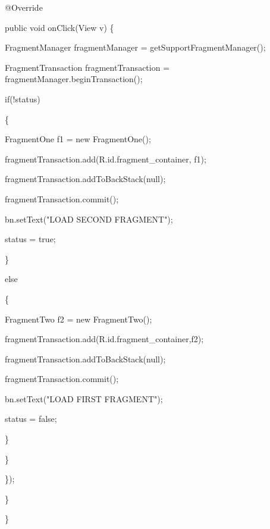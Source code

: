 \documentclass{article}
\begin{document}
@Override

public void onClick(View v) \{

FragmentManager fragmentManager = getSupportFragmentManager();

FragmentTransaction fragmentTransaction = fragmentManager.beginTransaction();

if(!status)

\{

FragmentOne f1 = new FragmentOne();

fragmentTransaction.add(R.id.fragment\_container, f1);

fragmentTransaction.addToBackStack(null);

fragmentTransaction.commit();

bn.setText("LOAD SECOND FRAGMENT");

status = true;

\}

else

\{

FragmentTwo f2 = new FragmentTwo();

fragmentTransaction.add(R.id.fragment\_container,f2);

fragmentTransaction.addToBackStack(null);

fragmentTransaction.commit();

bn.setText("LOAD FIRST FRAGMENT");

status = false;

\}

\}

\});

\}

\}

\bigskip 

\bigskip 

\bigskip 

\bigskip 

\bigskip 

\bigskip 

\bigskip 

\bigskip 

\bigskip 

\bigskip 

\bigskip 

\bigskip 

\bigskip 
\end{document}
